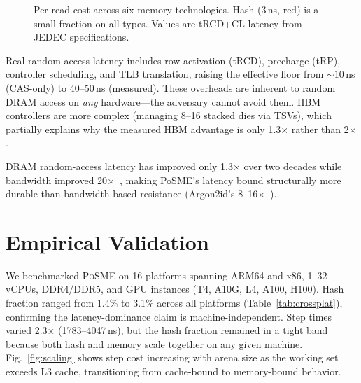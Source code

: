 \documentclass[conference,twocolumn]{IEEEtran}
\newcommand{\posme}{\textsc{PoSME}}
\begin{document}
\begin{figure}[t]
\centering
{}
\caption{Per-read cost across six memory technologies. Hash
(3\,ns, red) is a small fraction on all types. Values are
tRCD+CL latency from JEDEC specifications.}
\label{fig:cost-breakdown}
\end{figure}

Real random-access latency includes row activation (tRCD),
precharge (tRP), controller scheduling, and TLB translation,
raising the effective floor from ${\sim}10$\,ns (CAS-only) to
40--50\,ns (measured). These overheads are inherent to random
DRAM access on \emph{any} hardware---the adversary cannot avoid
them. HBM controllers are more complex (managing 8--16 stacked
dies via TSVs), which partially explains why the measured HBM
advantage is only 1.3$\times$ rather than 2$\times$.

DRAM random-access latency has improved only 1.3$\times$ over two
decades while bandwidth improved
20$\times$~\cite{chang2017}, making PoSME's latency bound
structurally more durable than bandwidth-based resistance
(Argon2id's 8--16$\times$~\cite{biryukov2016,ren2017}).

\section{Empirical Validation}

We benchmarked \posme{} on 16 platforms spanning ARM64 and x86,
1--32 vCPUs, DDR4/DDR5, and GPU instances (T4, A10G, L4, A100,
H100). Hash fraction ranged from 1.4\% to 3.1\% across all
platforms (Table~\ref{tab:crossplat}), confirming the
latency-dominance claim is machine-independent. Step times varied
2.3$\times$ (1783--4047\,ns), but the hash fraction remained in
a tight band because both hash and memory scale together on any
given machine. Fig.~\ref{fig:scaling} shows step cost increasing
with arena size as the working set exceeds L3 cache, transitioning
from cache-bound to memory-bound behavior.
\end{document}
